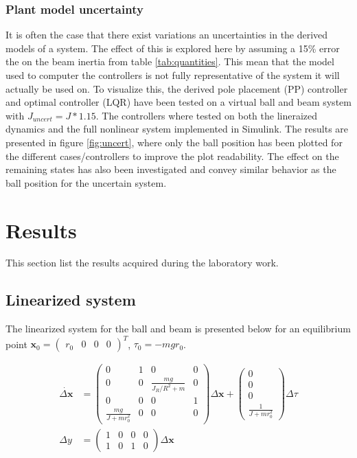 \documentclass[a4paper, titlepage]{article}
\begin{document}
\subsubsection{Plant model uncertainty}
It is often the case that there exist variations an uncertainties in the derived models of a system.
The effect of this is explored here by assuming a 15\% error the on the beam inertia from table \ref{tab:quantities}.
This mean that the model used to computer the controllers is not fully representative of the system it will actually be used on.
To visualize this, the derived pole placement (PP) controller and optimal controller (LQR) have been tested on a virtual ball and beam system with $J_{uncert} = J*1.15$.
The controllers where tested on both the lineraized dynamics and the full nonlinear system implemented in Simulink.
The results are presented in figure \ref{fig:uncert}, where only the ball position has been plotted for the different cases/controllers to improve the plot readability.
The effect on the remaining states has also been investigated and convey similar behavior as the ball position for the uncertain system.


\section{Results}
This section list the results acquired during the laboratory work.

\subsection{Linearized system}
The linearized system for the ball and beam is presented below for an equilibrium point $\textbf{x}_0 = \begin{pmatrix} r_0 & 0 & 0 & 0 \end{pmatrix}^T$, $\tau_0 = -mgr_0$.

\begin{equation}
\begin{split}
\dot{\Delta\textbf{x}} &= 
\begin{pmatrix}
0 & 1 & 0 & 0 \\
0 & 0 & \frac{mg}{J_R/R^2 + m} & 0 \\
0 & 0 & 0 & 1 \\
\frac{mg}{J + mr_0^2} & 0 & 0 & 0
\end{pmatrix}\Delta\textbf{x} + \begin{pmatrix}
0 \\ 0 \\ 0 \\ \frac{1}{J + mr_0^2}
\end{pmatrix}\Delta\tau \\
\Delta y &= \begin{pmatrix}
1 & 0 & 0 & 0 \\
1 & 0 & 1 & 0
\end{pmatrix}\Delta\textbf{x}
\end{split}
\label{equ:linSys}
\end{equation}
\end{document}
